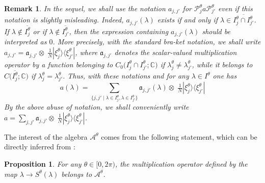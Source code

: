 \documentclass[11pt]{article}
\def\a{\mathfrak a}
\def\AA{\mathcal A}
\def\C{\mathbb C}
\def\P{\mathcal P}
\newtheorem{Remark}[Theorem]{Remark}
\newtheorem{Proposition}[Theorem]{Proposition}
\begin{document}
\begin{Remark}\label{rem:misleading}
In the sequel, we shall use the notation $a_{j,j'}$ for $\P_j^\theta a \P_{j'}^\theta$
even if this notation is slightly misleading. Indeed, $a_{j,j'}(\lambda)$ exists if and only if 
$\lambda \in  \overline{I_j^\theta \cap I_{j'}^\theta}$. 
If $\lambda \not \in 
\overline{I_j^\theta}$ or if $\lambda \not \in\overline{I^\theta_{j'}}$, then the expression containing
$a_{j,j'}(\lambda)$ should be interpreted as $0$.
More precisely, with the standard bra-ket notation, we shall write
$a_{j,j'}=\a_{j,j'}\otimes \;\!\tfrac{1}{N}|\xi^\theta_j\rangle \langle \xi^\theta_{j'}|$,
where $\a_{j,j'}$ denotes the scalar-valued multiplication operator by a function belonging to  
$C_0\big(I_j^\theta \cap I_{j'}^\theta; \C\big)$ if  $\lambda_j^\theta\neq \lambda_{j'}^\theta$, while it belongs to $C\big(\overline{I_j^\theta}; \C\big)$
if  $\lambda_j^\theta = \lambda_{j'}^\theta$.
Thus, with these notations and for any $\lambda \in I^\theta$ one has
\begin{equation}\label{eq_decc}
a(\lambda)=\sum_{\{j,j'\mid \lambda\in I^\theta_j, \lambda \in I^\theta_{j'}\}}
\a_{j,j'}(\lambda) \otimes \;\!\tfrac{1}{N}|\xi^\theta_j\rangle \langle \xi^\theta_{j'}|
\end{equation}
By the above abuse of notation, we shall conveniently write
$a=\sum_{j,j'}
\a_{j,j'}\otimes \;\!\frac{1}{N}|\xi^\theta_j\rangle \langle \xi^\theta_{j'}|$.
\end{Remark}

The interest of the algebra $\AA^\theta$ comes from the following statement, which can be directly inferred from \cite[Thms 3.9 \& 3.10]{NRT}\;\!:

\begin{Proposition}\label{prop_S}
For any $\theta \in [0,2\pi)$, the multiplication operator defined by the map $\lambda \to S^\theta(\lambda)$ belongs to $\AA^\theta$. 
\end{Proposition}
\end{document}
